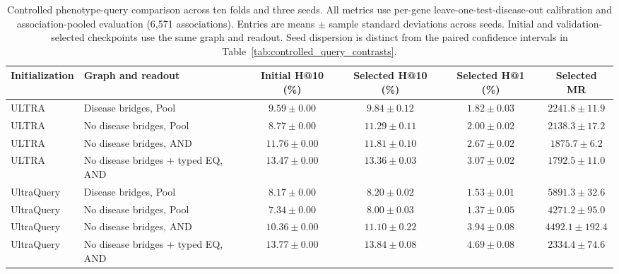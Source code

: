 \begin{table}[tb]
\centering\small
\caption{Controlled phenotype-query comparison across ten folds and three seeds. All metrics use per-gene leave-one-test-disease-out calibration and association-pooled evaluation (6,571 associations). Entries are means $\pm$ sample standard deviations across seeds. Initial and validation-selected checkpoints use the same graph and readout. Seed dispersion is distinct from the paired confidence intervals in Table~\ref{tab:controlled_query_contrasts}.}
\label{tab:controlled_query}
\begin{adjustbox}{max width=\linewidth}
\begin{tabular}{llcccc}
\toprule
Initialization & Graph and readout & Initial H@10 (\%) & Selected H@10 (\%) & Selected H@1 (\%) & Selected MR \\
\midrule
ULTRA & Disease bridges, Pool & $9.59\pm 0.00$ & $9.84\pm 0.12$ & $1.82\pm 0.03$ & $2241.8\pm 11.9$ \\
ULTRA & No disease bridges, Pool & $8.77\pm 0.00$ & $11.29\pm 0.11$ & $2.00\pm 0.02$ & $2138.3\pm 17.2$ \\
ULTRA & No disease bridges, AND & $11.76\pm 0.00$ & $11.81\pm 0.10$ & $2.67\pm 0.02$ & $1875.7\pm 6.2$ \\
ULTRA & No disease bridges + typed EQ, AND & $13.47\pm 0.00$ & $13.36\pm 0.03$ & $3.07\pm 0.02$ & $1792.5\pm 11.0$ \\
UltraQuery & Disease bridges, Pool & $8.17\pm 0.00$ & $8.20\pm 0.02$ & $1.53\pm 0.01$ & $5891.3\pm 32.6$ \\
UltraQuery & No disease bridges, Pool & $7.34\pm 0.00$ & $8.00\pm 0.03$ & $1.37\pm 0.05$ & $4271.2\pm 95.0$ \\
UltraQuery & No disease bridges, AND & $10.36\pm 0.00$ & $11.10\pm 0.22$ & $3.94\pm 0.08$ & $4492.1\pm 192.4$ \\
UltraQuery & No disease bridges + typed EQ, AND & $13.77\pm 0.00$ & $13.84\pm 0.08$ & $4.69\pm 0.08$ & $2334.4\pm 74.6$ \\
\bottomrule
\end{tabular}
\end{adjustbox}
\end{table}

